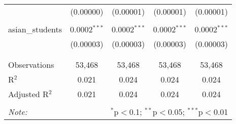 \begin{table}[!htbp]
\begin{tabular}{@{\extracolsep{-2pt}}lcccc}
  & (0.00000) & (0.00001) & (0.00001) & (0.00001) \\ 
  & & & & \\ 
 asian\_students & 0.0002$^{***}$ & 0.0002$^{***}$ & 0.0002$^{***}$ & 0.0002$^{***}$ \\ 
  & (0.00003) & (0.00003) & (0.00003) & (0.00003) \\ 
  & & & & \\ 
\hline \\[-1.8ex] 
Observations & 53,468 & 53,468 & 53,468 & 53,468 \\ 
R$^{2}$ & 0.021 & 0.024 & 0.024 & 0.024 \\ 
Adjusted R$^{2}$ & 0.021 & 0.024 & 0.024 & 0.024 \\ 
\hline 
\hline \\[-1.8ex] 
\textit{Note:}  & \multicolumn{4}{r}{$^{*}$p$<$0.1; $^{**}$p$<$0.05; $^{***}$p$<$0.01} \\ 
\end{tabular} 
\end{table} 

